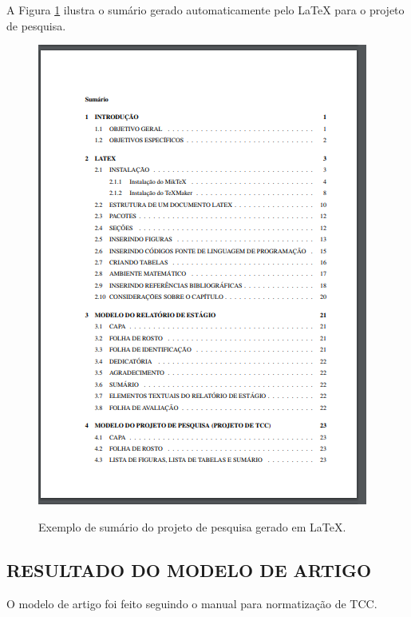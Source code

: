 \newpage
A Figura \ref{sumProj} ilustra o sumário gerado automaticamente pelo LaTeX para o projeto de pesquisa.\\
\begin{figure}[h]
	\centering
	\includegraphics{imagens/projetoPesq/Sumario.png}\\
	\caption{Exemplo de sumário do projeto de pesquisa gerado em LaTeX.}
	\label{sumProj}
\end{figure}

\newpage
\subsection{RESULTADO DO MODELO DE ARTIGO}
O modelo de artigo foi feito seguindo o manual para normatização de TCC\cite{manualTCC}.

